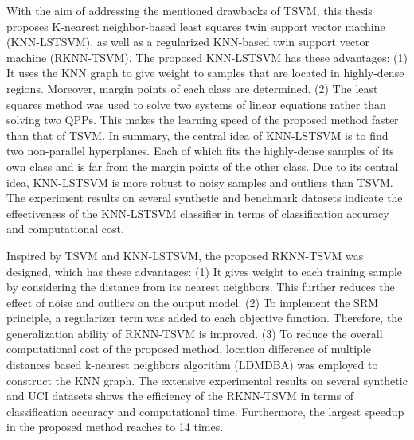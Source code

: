 \documentclass[a4paper, 12pt]{article}
\begin{document}
With the aim of addressing the mentioned drawbacks of TSVM, this thesis proposes K-nearest neighbor-based least squares twin support vector machine (KNN-LSTSVM), as well as a regularized KNN-based twin support vector machine (RKNN-TSVM). The proposed KNN-LSTSVM has these advantages: (1) It uses the KNN graph to give weight to samples that are located in highly-dense regions. Moreover, margin points of each class are determined. (2) The least squares method was used to solve two systems of linear equations rather than solving two QPPs. This makes the learning speed of the proposed method faster than that of TSVM. In summary, the central idea of KNN-LSTSVM is to find two non-parallel hyperplanes. Each of which fits the highly-dense samples of its own class and is far from the margin points of the other class. Due to its central idea, KNN-LSTSVM is more robust to noisy samples and outliers than TSVM. The experiment results on several synthetic and benchmark datasets indicate the effectiveness of the KNN-LSTSVM classifier in terms of classification accuracy and computational cost.

Inspired by TSVM and KNN-LSTSVM, the proposed RKNN-TSVM was designed, which has these advantages: (1) It gives weight to each training sample by considering the distance from its nearest neighbors. This further reduces the effect of noise and outliers on the output model. (2) To implement the SRM principle, a regularizer term was added to each objective function. Therefore, the generalization ability of RKNN-TSVM is improved. (3) To reduce the overall computational cost of the proposed method, location difference of multiple distances based k-nearest neighbors algorithm (LDMDBA) was employed to construct the KNN graph. The extensive experimental results on several synthetic and UCI datasets shows the efficiency of the RKNN-TSVM in terms of classification accuracy and computational time. Furthermore, the largest speedup in the proposed method reaches to 14 times.
\end{document}
